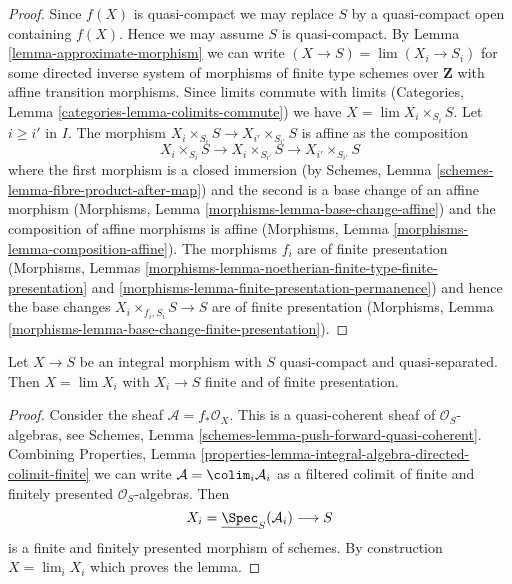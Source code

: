 \begin{proof}
Since $f(X)$ is quasi-compact we may replace $S$ by a quasi-compact
open containing $f(X)$. Hence we may assume $S$ is quasi-compact.
By Lemma \ref{lemma-approximate-morphism} we can write
$(X \to S) = \lim (X_i \to S_i)$ for some directed inverse system
of morphisms of finite type schemes over $\mathbf{Z}$ with
affine transition morphisms. Since limits commute with limits
(Categories, Lemma \ref{categories-lemma-colimits-commute})
we have $X = \lim X_i \times_{S_i} S$.
Let $i \geq i'$ in $I$. The morphism
$X_i \times_{S_i} S \to X_{i'} \times_{S_{i'}} S$
is affine as the composition
$$
X_i \times_{S_i} S \to X_i \times_{S_{i'}} S \to X_{i'} \times_{S_{i'}} S
$$
where the first morphism is a closed immersion (by
Schemes, Lemma \ref{schemes-lemma-fibre-product-after-map})
and the second is a base change of an affine morphism
(Morphisms, Lemma \ref{morphisms-lemma-base-change-affine})
and the composition of affine morphisms is affine
(Morphisms, Lemma \ref{morphisms-lemma-composition-affine}).
The morphisms $f_i$ are of finite presentation
(Morphisms, Lemmas
\ref{morphisms-lemma-noetherian-finite-type-finite-presentation} and
\ref{morphisms-lemma-finite-presentation-permanence})
and hence the base changes $X_i \times_{f_i, S_i} S \to S$
are of finite presentation
(Morphisms, Lemma \ref{morphisms-lemma-base-change-finite-presentation}).
\end{proof}

\begin{lemma}
\label{lemma-integral-limit-finite-and-finite-presentation}
Let $X \to S$ be an integral morphism with $S$ quasi-compact and
quasi-separated. Then $X = \lim X_i$ with $X_i \to S$ finite and
of finite presentation.
\end{lemma}

\begin{proof}
Consider the sheaf $\mathcal{A} = f_*\mathcal{O}_X$.
This is a quasi-coherent sheaf of $\mathcal{O}_S$-algebras, see
Schemes, Lemma \ref{schemes-lemma-push-forward-quasi-coherent}.
Combining
Properties, Lemma
\ref{properties-lemma-integral-algebra-directed-colimit-finite}
we can write $\mathcal{A} = \colim_i \mathcal{A}_i$ as a filtered
colimit of finite and finitely presented $\mathcal{O}_S$-algebras.
Then
$$
X_i = \underline{\Spec}_S(\mathcal{A}_i)
\longrightarrow
S
$$
is a finite and finitely presented morphism of schemes. By construction
$X = \lim_i X_i$ which proves the lemma.
\end{proof}








